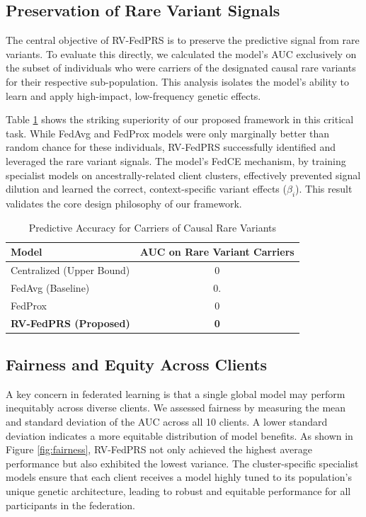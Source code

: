 \documentclass[conference]{IEEEtran}
\begin{document}
\subsection{Preservation of Rare Variant Signals}

The central objective of RV-FedPRS is to preserve the predictive signal from rare variants. To evaluate this directly, we calculated the model's AUC exclusively on the subset of individuals who were carriers of the designated causal rare variants for their respective sub-population. This analysis isolates the model's ability to learn and apply high-impact, low-frequency genetic effects.

Table \ref{tab:rv_performance} shows the striking superiority of our proposed framework in this critical task. While FedAvg and FedProx models were only marginally better than random chance for these individuals, RV-FedPRS successfully identified and leveraged the rare variant signals. The model's FedCE mechanism, by training specialist models on ancestrally-related client clusters, effectively prevented signal dilution and learned the correct, context-specific variant effects ($\beta_i$). This result validates the core design philosophy of our framework.

\begin{table}[h!]
\centering
\caption{Predictive Accuracy for Carriers of Causal Rare Variants}
\label{tab:rv_performance}
\begin{tabular}{lc}
\hline
\textbf{Model} & \textbf{AUC on Rare Variant Carriers} \\ \hline
Centralized (Upper Bound) & 0 \\
FedAvg (Baseline) & 0. \\
FedProx & 0 \\
\textbf{RV-FedPRS (Proposed)} & \textbf{0} \\ \hline
\end{tabular}
\end{table}

\subsection{Fairness and Equity Across Clients}

A key concern in federated learning is that a single global model may perform inequitably across diverse clients. We assessed fairness by measuring the mean and standard deviation of the AUC across all 10 clients. A lower standard deviation indicates a more equitable distribution of model benefits. As shown in Figure \ref{fig:fairness}, RV-FedPRS not only achieved the highest average performance but also exhibited the lowest variance. The cluster-specific specialist models ensure that each client receives a model highly tuned to its population's unique genetic architecture, leading to robust and equitable performance for all participants in the federation.
\end{document}
